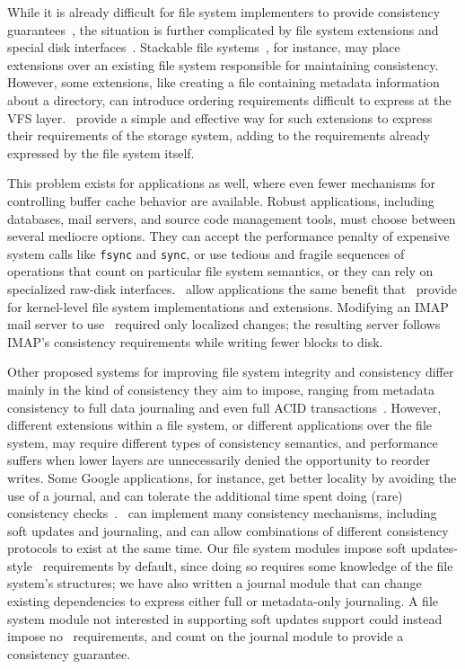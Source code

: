 While it is already difficult for file system implementers to provide
 consistency guarantees~\cite{tweedie98journaling,mckusick99soft},
 the situation is further complicated by file system extensions and
 special disk interfaces~\cite{soules03metadata,fast04versionfs,quinlan02venti,cornell04wayback,wright03ncryptfs,sivathanu03semantically-smart,sivathanu05database-aware}.
%
Stackable file systems~\cite{zadok00fist,zadok99extending,heidemann94filesystem,rosenthal90evolving},
 for instance, may place extensions over an existing file system
 responsible for maintaining consistency.
%
However, some extensions, like creating a file containing metadata
 information about a directory, can introduce ordering requirements
 difficult to express at the VFS layer.
%
\Patches\ provide a simple and effective way for such extensions to
 express their requirements of the storage system, adding to the
 requirements already expressed by the file system itself.


This problem exists for applications as well, where even fewer mechanisms
 for controlling buffer cache behavior are available.
%
Robust applications, including databases, mail servers, and source code
 management tools, must choose between several mediocre options.
%
They can accept the performance penalty of expensive system calls like
 \texttt{fsync} and \texttt{sync}, or use tedious and fragile sequences
 of operations that count on particular file system semantics, or they
 can rely on specialized raw-disk interfaces.
%
\Patchgroups\ allow applications the same benefit that \patches\ provide
 for kernel-level file system implementations and extensions.
%
Modifying an IMAP mail server to use \patchgroups\ required only localized
 changes; the resulting server follows IMAP's consistency requirements
 while writing fewer blocks to disk. 


Other proposed systems for improving file system integrity and consistency
 differ mainly in the kind of consistency they aim to impose, ranging from
 metadata consistency to full data journaling and even full ACID
 transactions~\cite{gal05transactional,liskov04transactional}.
%
However, different extensions within a file system, or different
 applications over the file system, may require different types of
 consistency semantics, and performance suffers when lower layers are
 unnecessarily denied the opportunity to reorder writes.
%
Some Google applications, for instance, get better locality by avoiding the
 use of a journal, and can tolerate the additional time spent doing (rare)
 consistency checks~\cite{googleext2}.
%
\Patches\ can implement many consistency mechanisms, including
 soft updates and journaling, and can allow combinations of different
 consistency protocols to exist at the same time.
%
Our file system modules impose soft updates-style \patch\ requirements by
 default, since doing so requires some knowledge of the file system's
 structures; we have also written a journal module that can change
 existing dependencies to express either full or metadata-only journaling.
%
A file system module not interested in supporting soft updates support
 could instead impose no \patch\ requirements, and count on the journal
 module to provide a consistency guarantee.


